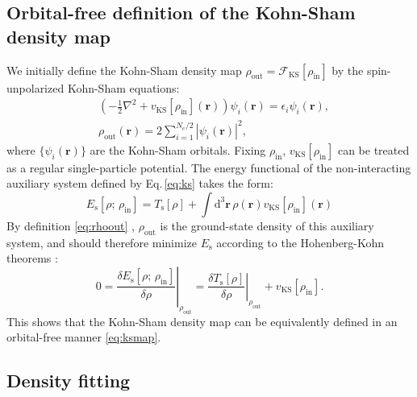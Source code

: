 \documentclass[%
reprint,
superscriptaddress,
bibnotes,
amsmath,amssymb,
aps,
floatfix, %
]{revtex4-2}
\begin{document}
\subsection{\label{sec:ofksmap}Orbital-free definition of the Kohn-Sham density map}
\noindent We initially define the Kohn-Sham density map $\rho_\text{out} = \mathcal{F}_\text{KS}[\rho_\text{in}]$ by the spin-unpolarized Kohn-Sham equations:
\begin{align}
  &\left(-\frac{1}{2}\nabla^2 + v_\text{KS}[\rho_\text{in}](\mathbf{r}) \right) \psi_i(\mathbf{r}) = \epsilon_i \psi_i(\mathbf{r}) \label{eq:ks}, \\
  &\rho_\text{out}(\mathbf{r}) = 2\sum_{i=1}^{N_e/2} |\psi_i(\mathbf{r})|^2 \label{eq:rhoout},
\end{align}
where $\{\psi_i(\mathbf{r})\}$ are the Kohn-Sham orbitals. Fixing $\rho_\text{in}$, $v_\text{KS}[\rho_\text{in}]$ can be treated as a regular single-particle potential. The energy functional of the non-interacting auxiliary system defined by Eq.\,\eqref{eq:ks} takes the form:
\begin{equation}
    E_\text{s}[\rho; \, \rho_\text{in}] = T_\text{s}[\rho] + \int \mathrm{d}^3 \mathbf{r} \, \rho(\mathbf{r}) v_\text{KS}[\rho_\text{in}](\mathbf{r})
\end{equation}
By definition \eqref{eq:rhoout} , $\rho_\text{out}$ is the ground-state density of this auxiliary system, and should therefore minimize $E_\text{s}$ according to the Hohenberg-Kohn theorems \cite{hohenberg1964}:
\begin{equation}
    0 = \left.\frac{\delta E_\text{s}[\rho; \, \rho_\text{in}]}{\delta{\rho}}\right\rvert_{\rho_\text{out}} = \left.\frac{\delta T_\text{s}[\rho]}{\delta \rho} \right\rvert_{\rho_\text{out}} + v_\text{KS}[\rho_\text{in}].
\end{equation}
This shows that the Kohn-Sham density map can be equivalently defined in an orbital-free manner \eqref{eq:ksmap}.

\subsection{\label{sec:df}Density fitting}
\end{document}

